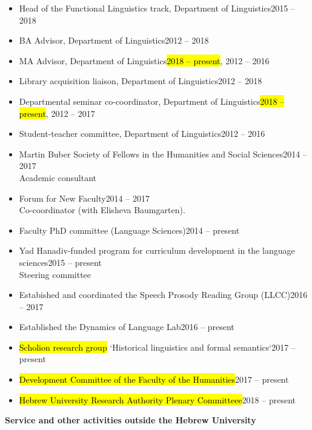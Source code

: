 \documentclass[letterpaper,11pt]{article}
\newcommand{\resheading}[1]{
\vspace*{6pt}
{\large \colorbox{mygrey}{\begin{minipage}{\textwidth}{\textbf{#1 \vphantom{p\^{E}}}}\end{minipage}}}
}
\begin{document}
\begin{itemize}
\vspace{-0.025 in}
\vspace*{-2pt}
\item {Head of the Functional Linguistics track, Department of 				Linguistics}\hfill{2015 -- 2018} 
\item
{BA Advisor, Department of Linguistics}\hfill{2012 -- 2018}
\item
{MA Advisor, Department of Linguistics}\hfill{\hl{2018 -- present}, 2012 -- 2016}
\item
{Library acquisition liaison, Department of Linguistics}\hfill{2012 -- 2018}
\item {Departmental seminar co-coordinator, Department of Linguistics}\hfill{\hl{2018 -- present}, 2012 -- 2017}
\item {Student-teacher committee, Department of Linguistics}\hfill{2012 -- 2016}
\item Martin Buber Society of Fellows in the Humanities and Social Sciences\hfill{2014 -- 2017}\\Academic consultant 
\item Forum for New Faculty\hfill{2014 -- 2017}\\Co-coordinator (with Elisheva Baumgarten).
\item Faculty PhD committee (Language Sciences)\hfill{2014 -- present}
\item Yad Hanadiv-funded program for curriculum development in the language sciences\hfill{2015 -- present}\\Steering committee
\item Estabished and coordinated the Speech Prosody Reading Group (LLCC)\hfill{2016 -- 2017}\\
\item Established the Dynamics of Language Lab\hfill{2016 -- present}
\item \hl{Scholion research group} {`Historical linguistics and formal semantics`}\hfill{2017 -- present}
\item \hl{Development Committee of the Faculty of the 				Humanities}\hfill{2017 -- present}
\item \hl{Hebrew University Research Authority Plenary Committeee}\hfill{2018 -- present}
\end{itemize}
\newpage
\resheading{Service and other activities outside the Hebrew University} 
\end{document}
